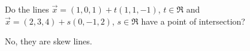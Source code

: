 
\begin{Exercise}[
name={},
title={}, 
difficulty=0,
origin={\cite{SM}}]

Do the lines $\vec{x} = (1,0,1) + t(1,1,-1)$, $t\in\Re$ and $\vec{x}=(2,3,4)+s(0,-1,2)$, $s\in\Re$ have a point of intersection?

\end{Exercise}

\begin{Answer}
No, they are skew lines.
\end{Answer}
